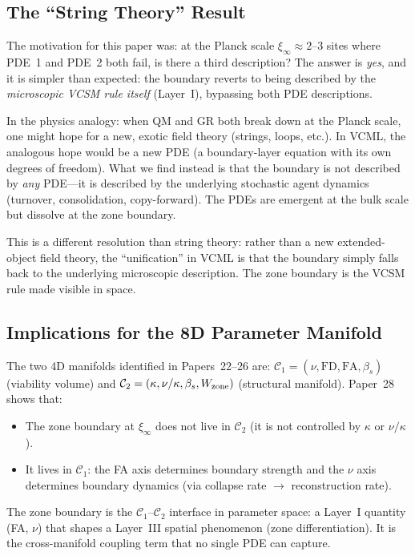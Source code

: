 \documentclass[11pt,a4paper]{article}
\begin{document}
\subsection{The ``String Theory'' Result}

The motivation for this paper was: at the Planck scale $\xi_\infty\approx2$--$3$
sites where PDE~1 and PDE~2 both fail, is there a third description?
The answer is \emph{yes}, and it is simpler than expected: the boundary
reverts to being described by the \emph{microscopic VCSM rule itself}
(Layer~I), bypassing both PDE descriptions.

In the physics analogy: when QM and GR both break down at the Planck scale,
one might hope for a new, exotic field theory (strings, loops, etc.).
In VCML, the analogous hope would be a new PDE (a boundary-layer equation
with its own degrees of freedom).
What we find instead is that the boundary is not described by \emph{any}
PDE---it is described by the underlying stochastic agent dynamics (turnover,
consolidation, copy-forward).  The PDEs are emergent at the bulk scale but
dissolve at the zone boundary.

This is a different resolution than string theory: rather than a new
extended-object field theory, the ``unification'' in VCML is that the
boundary simply falls back to the underlying microscopic description.
The zone boundary is the VCSM rule made visible in space.

\subsection{Implications for the 8D Parameter Manifold}

The two 4D manifolds identified in Papers~22--26 are:
$\mathcal{C}_1 = (\nu, \mathrm{FD}, \mathrm{FA}, \beta_s)$ (viability volume)
and $\mathcal{C}_2 = (\kappa, \nu/\kappa, \beta_s, W_{\rm zone})$ (structural manifold).
Paper~28 shows that:
\begin{itemize}
  \item The zone boundary at $\xi_\infty$ does not live in $\mathcal{C}_2$
  (it is not controlled by $\kappa$ or $\nu/\kappa$).
  \item It lives in $\mathcal{C}_1$: the FA axis determines boundary strength
  and the $\nu$ axis determines boundary dynamics (via collapse rate $\to$
  reconstruction rate).
\end{itemize}
The zone boundary is the $\mathcal{C}_1$--$\mathcal{C}_2$ interface in
parameter space: a Layer~I quantity (FA, $\nu$) that shapes a Layer~III
spatial phenomenon (zone differentiation).  It is the cross-manifold
coupling term that no single PDE can capture.
\end{document}
